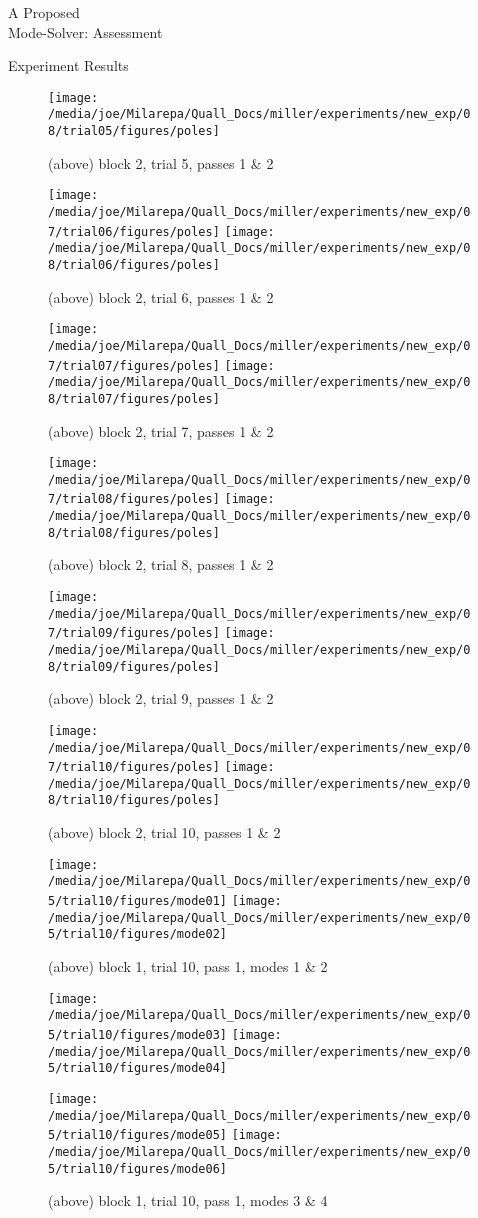 \documentclass[a4paper,10pt]{report}
\numberwithin{equation}{section}
\begin{document}
\begin{chapter}{A Proposed \\Mode-Solver: Assessment}
\begin{section}{Experiment Results}
\begin{singlespace}
\begin{figure}[h]
\texttt{[image: /media/joe/Milarepa/Quall\_Docs/miller/experiments/new\_exp/08/trial05/figures/poles]}
\caption{(above) block 2, trial 5, passes 1 \& 2}
\texttt{[image: /media/joe/Milarepa/Quall\_Docs/miller/experiments/new\_exp/07/trial06/figures/poles]}
\texttt{[image: /media/joe/Milarepa/Quall\_Docs/miller/experiments/new\_exp/08/trial06/figures/poles]}
\caption{(above) block 2, trial 6, passes 1 \& 2}
\end{figure}
\begin{figure}[h]
\texttt{[image: /media/joe/Milarepa/Quall\_Docs/miller/experiments/new\_exp/07/trial07/figures/poles]}
\texttt{[image: /media/joe/Milarepa/Quall\_Docs/miller/experiments/new\_exp/08/trial07/figures/poles]}
\caption{(above) block 2, trial 7, passes 1 \& 2}
\texttt{[image: /media/joe/Milarepa/Quall\_Docs/miller/experiments/new\_exp/07/trial08/figures/poles]}
\texttt{[image: /media/joe/Milarepa/Quall\_Docs/miller/experiments/new\_exp/08/trial08/figures/poles]}
\caption{(above) block 2, trial 8, passes 1 \& 2}
\end{figure}
\begin{figure}[h]
\texttt{[image: /media/joe/Milarepa/Quall\_Docs/miller/experiments/new\_exp/07/trial09/figures/poles]}
\texttt{[image: /media/joe/Milarepa/Quall\_Docs/miller/experiments/new\_exp/08/trial09/figures/poles]}
\caption{(above) block 2, trial 9, passes 1 \& 2}
\texttt{[image: /media/joe/Milarepa/Quall\_Docs/miller/experiments/new\_exp/07/trial10/figures/poles]}
\texttt{[image: /media/joe/Milarepa/Quall\_Docs/miller/experiments/new\_exp/08/trial10/figures/poles]}
\caption{(above) block 2, trial 10, passes 1 \& 2}
\end{figure}
\begin{figure}[h]\label{fig:mode_contours}
\texttt{[image: /media/joe/Milarepa/Quall\_Docs/miller/experiments/new\_exp/05/trial10/figures/mode01]}
\texttt{[image: /media/joe/Milarepa/Quall\_Docs/miller/experiments/new\_exp/05/trial10/figures/mode02]}
\caption{(above) block 1, trial 10, pass 1, modes 1 \& 2}
\texttt{[image: /media/joe/Milarepa/Quall\_Docs/miller/experiments/new\_exp/05/trial10/figures/mode03]}
\texttt{[image: /media/joe/Milarepa/Quall\_Docs/miller/experiments/new\_exp/05/trial10/figures/mode04]}
\caption{(above) block 1, trial 10, pass 1, modes 3 \& 4}
\texttt{[image: /media/joe/Milarepa/Quall\_Docs/miller/experiments/new\_exp/05/trial10/figures/mode05]}
\texttt{[image: /media/joe/Milarepa/Quall\_Docs/miller/experiments/new\_exp/05/trial10/figures/mode06]}

\end{figure}
\end{singlespace}
\end{section}
\end{chapter}
\end{document}
